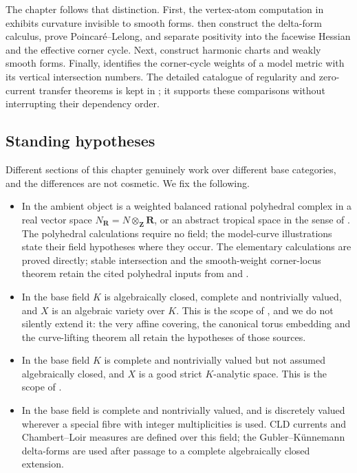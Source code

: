 The chapter follows that distinction.  First, the vertex-atom computation
in  exhibits curvature invisible to smooth forms.
 then construct the
delta-form calculus, prove Poincar\'e--Lelong, and separate positivity into
the facewise Hessian and the effective corner cycle.  Next,
 construct harmonic charts and
weakly smooth forms.  Finally,  identifies
the corner-cycle weights of a model metric with its vertical intersection
numbers.  The detailed catalogue of regularity and zero-current transfer
theorems is kept in ; it supports these comparisons
without interrupting their dependency order.

\subsection{Standing hypotheses}
\label{sec:ch18-hypotheses}

Different sections of this chapter genuinely work over different base
categories, and the differences are not cosmetic.  We fix the following.

\begin{itemize}
\item In  the ambient object
 is a weighted balanced rational polyhedral complex in a real vector space
 $N_{\mathbf R}=N\otimes_{\mathbf Z}\mathbf R$, or an abstract tropical
 space in the sense of .  The polyhedral
 calculations require no field; the model-curve illustrations state their
 field hypotheses where they occur.  The elementary calculations are
 proved directly; stable intersection and
 the smooth-weight corner-locus theorem retain the cited polyhedral inputs
 from \cite{GK17} and .
\item In  the base
 field $K$ is algebraically closed, complete and nontrivially valued, and
 $X$ is an algebraic variety over $K$.  This is the scope of
 \cite{GK17,GK19}, and we do not silently extend it: the very affine
 covering, the canonical torus embedding and the curve-lifting theorem all
 retain the hypotheses of those sources.
\item In  the base field
 $K$ is complete and nontrivially valued but not assumed algebraically
 closed, and $X$ is a good strict $K$-analytic space.  This is the scope of
 \cite{GJR26,GR25PL,GR25Classical}.
\item In  the base field is complete and
 nontrivially valued, and is discretely valued wherever a special fibre with
 integer multiplicities is used.  CLD currents and Chambert--Loir measures
 are defined over this field; the Gubler--K\"unnemann delta-forms are used
 after passage to a complete algebraically closed extension.
\end{itemize}

